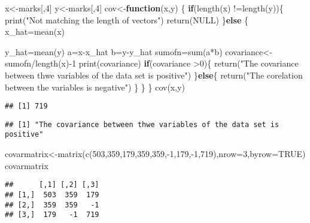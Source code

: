 \documentclass[
]{article}
\newenvironment{Shaded}{\begin{snugshade}}{\end{snugshade}}
\newcommand{\AttributeTok}[1]{\textcolor[rgb]{0.77,0.63,0.00}{#1}}
\newcommand{\ConstantTok}[1]{\textcolor[rgb]{0.00,0.00,0.00}{#1}}
\newcommand{\ControlFlowTok}[1]{\textcolor[rgb]{0.13,0.29,0.53}{\textbf{#1}}}
\newcommand{\DecValTok}[1]{\textcolor[rgb]{0.00,0.00,0.81}{#1}}
\newcommand{\FunctionTok}[1]{\textcolor[rgb]{0.00,0.00,0.00}{#1}}
\newcommand{\NormalTok}[1]{#1}
\newcommand{\OtherTok}[1]{\textcolor[rgb]{0.56,0.35,0.01}{#1}}
\newcommand{\SpecialCharTok}[1]{\textcolor[rgb]{0.00,0.00,0.00}{#1}}
\newcommand{\StringTok}[1]{\textcolor[rgb]{0.31,0.60,0.02}{#1}}
\begin{document}
\begin{Shaded}
\begin{Highlighting}[]
\NormalTok{x}\OtherTok{\textless{}{-}}\NormalTok{marks[,}\DecValTok{4}\NormalTok{]}
\NormalTok{y}\OtherTok{\textless{}{-}}\NormalTok{marks[,}\DecValTok{4}\NormalTok{]}
\NormalTok{cov}\OtherTok{\textless{}{-}}\ControlFlowTok{function}\NormalTok{(x,y) \{}
  \ControlFlowTok{if}\NormalTok{(}\FunctionTok{length}\NormalTok{(x) }\SpecialCharTok{!=}\FunctionTok{length}\NormalTok{(y))\{}
    \FunctionTok{print}\NormalTok{(}\StringTok{"Not matching the length of vectors"}\NormalTok{)}
    \FunctionTok{return}\NormalTok{(}\ConstantTok{NULL}\NormalTok{)}
\NormalTok{  \}}\ControlFlowTok{else}\NormalTok{ \{}
\NormalTok{    x\_hat}\OtherTok{=}\FunctionTok{mean}\NormalTok{(x)}
    
\NormalTok{    y\_hat}\OtherTok{=}\FunctionTok{mean}\NormalTok{(y)}
\NormalTok{    a}\OtherTok{=}\NormalTok{x}\SpecialCharTok{{-}}\NormalTok{x\_hat}
\NormalTok{    b}\OtherTok{=}\NormalTok{y}\SpecialCharTok{{-}}\NormalTok{y\_hat}
\NormalTok{    sumofn}\OtherTok{=}\FunctionTok{sum}\NormalTok{(a}\SpecialCharTok{*}\NormalTok{b)}
\NormalTok{    covariance}\OtherTok{\textless{}{-}}\NormalTok{sumofn}\SpecialCharTok{/}\FunctionTok{length}\NormalTok{(x)}\SpecialCharTok{{-}}\DecValTok{1}
    \FunctionTok{print}\NormalTok{(covariance)}
    \ControlFlowTok{if}\NormalTok{(covariance }\SpecialCharTok{\textgreater{}}\DecValTok{0}\NormalTok{)\{}
      \FunctionTok{return}\NormalTok{(}\StringTok{"The covariance between thwe variables of the data set is positive"}\NormalTok{)}
\NormalTok{    \}}\ControlFlowTok{else}\NormalTok{\{}
      \FunctionTok{return}\NormalTok{(}\StringTok{"The corelation between the variables is negative"}\NormalTok{)}
\NormalTok{    \}}
\NormalTok{  \}}
\NormalTok{\}}
\FunctionTok{cov}\NormalTok{(x,y)}
\end{Highlighting}
\end{Shaded}

\begin{verbatim}
## [1] 719
\end{verbatim}

\begin{verbatim}
## [1] "The covariance between thwe variables of the data set is positive"
\end{verbatim}

\begin{Shaded}
\begin{Highlighting}[]
\NormalTok{covarmatrix}\OtherTok{\textless{}{-}}\FunctionTok{matrix}\NormalTok{(}\FunctionTok{c}\NormalTok{(}\DecValTok{503}\NormalTok{,}\DecValTok{359}\NormalTok{,}\DecValTok{179}\NormalTok{,}\DecValTok{359}\NormalTok{,}\DecValTok{359}\NormalTok{,}\SpecialCharTok{{-}}\DecValTok{1}\NormalTok{,}\DecValTok{179}\NormalTok{,}\SpecialCharTok{{-}}\DecValTok{1}\NormalTok{,}\DecValTok{719}\NormalTok{),}\AttributeTok{nrow=}\DecValTok{3}\NormalTok{,}\AttributeTok{byrow=}\ConstantTok{TRUE}\NormalTok{)}
\NormalTok{covarmatrix}
\end{Highlighting}
\end{Shaded}

\begin{verbatim}
##      [,1] [,2] [,3]
## [1,]  503  359  179
## [2,]  359  359   -1
## [3,]  179   -1  719
\end{verbatim}
\end{document}
